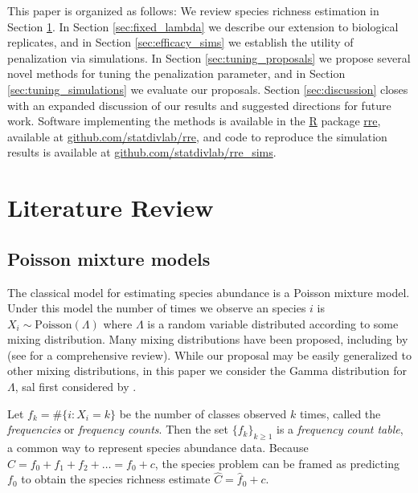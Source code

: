 \documentclass[oupdraft]{bio}
\begin{document}
This paper is organized as follows: We review species richness estimation in Section \ref{sec:literature_review}.  In Section \ref{sec:fixed_lambda} we describe our extension to biological replicates, and in Section \ref{sec:efficacy_sims} we establish the utility of penalization via simulations. In Section \ref{sec:tuning_proposals} we propose several novel methods for tuning the penalization parameter, and in Section \ref{sec:tuning_simulations}
we evaluate our proposals.  Section \ref{sec:discussion} closes with an expanded discussion of our results and suggested directions for future work. Software implementing the methods is available in the \url{R} package \url{rre}, available at \url{github.com/statdivlab/rre}, and code to reproduce the simulation results is available at \url{github.com/statdivlab/rre_sims}.


\section{Literature Review}

\label{sec:literature_review}

\subsection{Poisson mixture models}

The classical model for estimating species abundance is a Poisson mixture model.  Under this model the number of times we observe an species $i$ is $X_i \sim \text{Poisson}(\Lambda)$ where $\Lambda$ is a random variable distributed according to some mixing distribution.
Many mixing distributions have been proposed, including by  \cite{bulmer_1974,ord_1986,norris_1998} (see \cite{bunge_1993} for a comprehensive review). While our proposal may be easily generalized to other mixing distributions, in this paper we consider the Gamma  distribution for $\Lambda$, sal first considered by \citet{fisher_1943}.


Let $f_k = \#\{i: X_i = k\}$ be the number of classes observed $k$ times, called the \textit{frequencies} or \textit{frequency counts}.  Then the set $\{f_k\}_{k \geq 1}$ is a \textit{frequency count table}, a common way to represent species abundance data. Because $C = f_0 + f_1 + f_2 + \dots = f_0 + c$, the species problem can be framed as predicting $f_0$ to obtain the species richness estimate $\hat{C} = \hat{f}_0 + c$.
\end{document}
